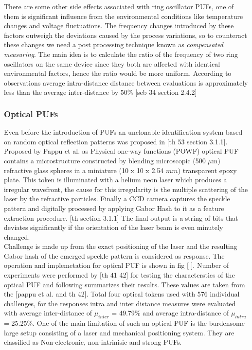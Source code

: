 There are some other side effects associated with ring oscillator PUFs, one of them is significant influence from the environmental conditions like temperature changes and voltage fluctuations. The frequency changes introduced by these factors outweigh the deviations caused by the process variations, so to counteract these changes we need a post processing technique known as \emph{compensated measuring}. The main idea is to calculate the ratio of the frequency of two ring oscillators
on the same device since they both are affected with identical environmental factors, hence the ratio would be more uniform. According to observations average intra-distance distance between evaluations is approximately less than the average inter-distance by 50\% [seb 34 section 2.4.2]

\subsubsection{Optical PUFs}

Even before the introduction of PUFs an unclonable identification system based on random optical reflection patterns was proposed in [th 53 section 3.1.1]. Proposed by Pappu et al. as Physical one-way functions (POWF) optical PUF contains a microstructure constructed by blending microscopic (500 $\mu$m) refractive glass spheres in a miniature (10 x 10 x 2.54 $mm$) transparent epoxy plate. This token is illuminated with a helium neon laser which produces a irregular wavefront,
the cause for this irregularity is the multiple scattering of the laser by the refractive particles. Finally a CCD camera captures the speckle pattern and digitally processed by applying Gabor Hash to it as a feature extraction procedure. [th section 3.1.1] The final output is a string of bits that deviates significantly if the orientation of the laser beam is even minutely changed.\\

Challenge is made up from the exact positioning of the laser and the resulting Gabor hash of the emerged speckle pattern is considered as response. The operation and implemetation for optical PUF is shown in fig [ ]. Number of experiments were performed by [th 41 42] for testing the characterstics of the optical PUF and following summarizes their results. These values are taken from the [pappu et al. and th 42]. Total four optical tokens used with 576 individual challenges, for the
responses intra and inter distance measures were evaluated with average inter-distance of $\mu_{inter}$ = 49.79\% and average intra-distance of
$\mu_{intra}$ = 25.25\%. One of the main limitation of such an optical PUF is the burdensome large setup consisting of a laser and mechanical positioning system. They are classified as Non-electronic, non-intrinisic and strong PUFs.\\

